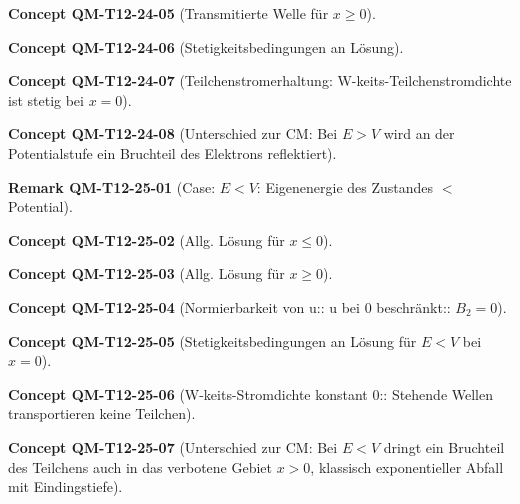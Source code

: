 \documentclass[10pt, letterpaper]{article}
\newcommand{\CustomHeading}[3]{%
  \par\medskip\noindent%
  \textbf{#1 #2} \textnormal{(#3)}.\enskip%
}
\newenvironment{REM}[2]{\CustomHeading{Remark}{#1}{#2}}{}
\newenvironment{CONC}[2]{\CustomHeading{Concept}{#1}{#2}}{}
\begin{document}
\begin{CONC}{QM-T12-24-05}{Transmitierte Welle für $x\geq 0$}
\end{CONC}

\begin{CONC}{QM-T12-24-06}{Stetigkeitsbedingungen an Lösung}
\end{CONC}

\begin{CONC}{QM-T12-24-07}{Teilchenstromerhaltung: W-keits-Teilchenstromdichte ist stetig bei $x=0$}
\end{CONC}

\begin{CONC}{QM-T12-24-08}{Unterschied zur CM: Bei $E>V$ wird an der Potentialstufe ein Bruchteil des Elektrons reflektiert}
\end{CONC}

\begin{REM}{QM-T12-25-01}{Case: $E<V$: Eigenenergie des Zustandes $<$ Potential}
\end{REM}

\begin{CONC}{QM-T12-25-02}{Allg. Lösung für $x\leq 0$}
\end{CONC}

\begin{CONC}{QM-T12-25-03}{Allg. Lösung für $x\geq 0$}
\end{CONC}

\begin{CONC}{QM-T12-25-04}{Normierbarkeit von u:: u bei $0$ beschränkt:: $B_2=0$}
\end{CONC}

\begin{CONC}{QM-T12-25-05}{Stetigkeitsbedingungen an Lösung für $E<V$ bei $x=0$}
\end{CONC}

\begin{CONC}{QM-T12-25-06}{W-keits-Stromdichte konstant 0:: Stehende Wellen transportieren keine Teilchen}
\end{CONC}

\begin{CONC}{QM-T12-25-07}{Unterschied zur CM: Bei $E<V$ dringt ein Bruchteil des Teilchens auch in das verbotene Gebiet $x>0$, klassisch exponentieller Abfall mit Eindingstiefe}
\end{CONC}
\end{document}
